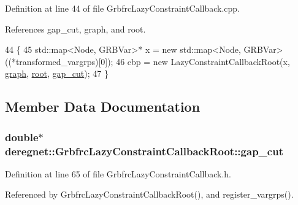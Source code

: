 Definition at line 44 of file Grbfrc\+Lazy\+Constraint\+Callback.\+cpp.



References gap\+\_\+cut, graph, and root.


\begin{DoxyCode}
44                                                         \{
45     std::map<Node, GRBVar>* x = \textcolor{keyword}{new} std::map<Node, GRBVar>((*transformed\_vargrps)[0]);
46     cbp = \textcolor{keyword}{new} LazyConstraintCallbackRoot(x, \hyperlink{classderegnet_1_1GrbfrcLazyConstraintCallbackRoot_a93e8aeef7796880ba2efa59770ed98ad}{graph}, \hyperlink{classderegnet_1_1GrbfrcLazyConstraintCallbackRoot_a49a59d875ea23a1b443ec39b3c221e4d}{root}, \hyperlink{classderegnet_1_1GrbfrcLazyConstraintCallbackRoot_aa396c45cfdd6231f7c93560f5ce3f013}{gap\_cut});
47 \}
\end{DoxyCode}


\subsection{Member Data Documentation}
\subsubsection[{\texorpdfstring{gap\+\_\+cut}{gap_cut}}]{\setlength{\rightskip}{0pt plus 5cm}double$\ast$ deregnet\+::\+Grbfrc\+Lazy\+Constraint\+Callback\+Root\+::gap\+\_\+cut\hspace{0.3cm}{\ttfamily [private]}}\hypertarget{classderegnet_1_1GrbfrcLazyConstraintCallbackRoot_aa396c45cfdd6231f7c93560f5ce3f013}{}\label{classderegnet_1_1GrbfrcLazyConstraintCallbackRoot_aa396c45cfdd6231f7c93560f5ce3f013}


Definition at line 65 of file Grbfrc\+Lazy\+Constraint\+Callback.\+h.



Referenced by Grbfrc\+Lazy\+Constraint\+Callback\+Root(), and register\+\_\+vargrps().


